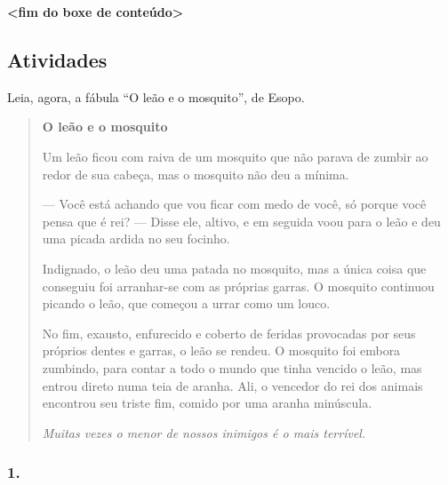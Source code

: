 \textbf{\textless{}fim do boxe de conteúdo\textgreater{}}

\subsection{Atividades}\label{atividades}

Leia, agora, a fábula ``O leão e o mosquito'', de Esopo.


\begin{quote}
\textbf{O leão e o mosquito}

Um leão ficou com raiva de um mosquito que não parava de zumbir ao redor
de sua cabeça, mas o mosquito não deu a mínima.

--- Você está achando que vou ficar com medo de você, só porque você
pensa que é rei? --- Disse ele, altivo, e em seguida voou para o leão e
deu uma picada ardida no seu focinho.

Indignado, o leão deu uma patada no mosquito, mas a única coisa que
conseguiu foi arranhar-se com as próprias garras. O mosquito continuou
picando o leão, que começou a urrar como um louco.

No fim, exausto, enfurecido e
coberto de feridas provocadas por seus próprios dentes e garras, o leão
se rendeu. O mosquito foi embora zumbindo, para contar a todo o mundo que
tinha vencido o leão, mas entrou direto numa teia de aranha. Ali, o
vencedor do rei dos animais encontrou seu triste fim, comido por uma
aranha minúscula.

\emph{Muitas vezes o menor de nossos inimigos é o mais terrível.}

\end{quote}

\subsubsection{1. }\label{section}

